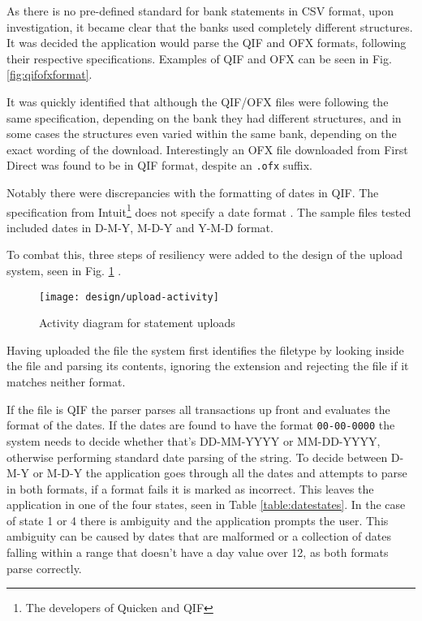 As there is no pre-defined standard for bank statements in CSV format, upon investigation, it became clear that the banks used completely different structures. It was decided the application would parse the QIF and OFX formats, following their respective specifications. Examples of QIF and OFX can be seen in Fig. \ref{fig:qifofxformat}.

It was quickly identified that although the QIF/OFX files were following the same specification, depending on the bank they had different structures, and in some cases the structures even varied within the same bank, depending on the exact wording of the download. Interestingly an OFX file downloaded from First Direct was found to be in QIF format, despite an \lstinline$.ofx$ suffix.

Notably there were discrepancies with the formatting of dates in QIF. The specification from Intuit\footnote{The developers of Quicken and QIF} does not specify a date format \cite{quiken2010qif}. The sample files tested included dates in D-M-Y, M-D-Y and Y-M-D format.



To combat this, three steps of resiliency were added to the design of the upload system, seen in Fig. \ref{fig:fileupload} .

\begin{figure}[h]
    \centering
    \texttt{[image: design/upload-activity]}
    \caption{Activity diagram for statement uploads}
    \label{fig:fileupload}
    
    \begin{comment}
(start)->(Upload File)->(Identify File Format)-><a>[QIF]->(Identify Date Format)->(Parse Transactions),
<a>[OFX]->(Parse Transactions)->(Remove Duplicates)->(end),
<a>[Other]->(Reject Upload)
    \end{comment}
\end{figure}

Having uploaded the file the system first identifies the filetype by looking inside the file and parsing its contents, ignoring the extension and rejecting the file if it matches neither format.

If the file is QIF the parser parses all transactions up front and evaluates the format of the dates. If the dates are found to have the format \lstinline$00-00-0000$ the system needs to decide whether that's DD-MM-YYYY or MM-DD-YYYY, otherwise performing standard date parsing of the string.
%
To decide between D-M-Y or M-D-Y the application goes through all the dates and attempts to parse in both formats, if a format fails it is marked as incorrect. This leaves the application in one of the four states, seen in Table \ref{table:datestates}. In the case of state 1 or 4 there is ambiguity and the application prompts the user. This ambiguity can be caused by dates that are malformed or a collection of dates falling within a range that doesn't have a day value over 12, as both formats parse correctly. 

